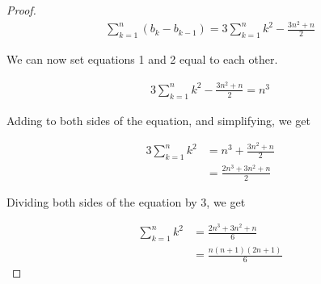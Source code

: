 \documentclass{article}
\begin{document}
\begin{proof}
\begin{align}
\sum_{k=1}^{n} (b_{k} - b_{k-1}) = 3 \sum_{k=1}^{n} k^2 - \frac{3n^2+n}{2}
\end{align}

\begin{flushleft}
We can now set equations 1 and 2 equal to each other.
\end{flushleft}

\begin{align*}
3 \sum_{k=1}^{n} k^2 - \frac{3n^2+n}{2} = n^3
\end{align*}

\begin{flushleft}
Adding to both sides of the equation, and simplifying, we get
\end{flushleft}

\begin{align*}
3 \sum_{k=1}^{n} k^2 &= n^3 + \frac{3n^2+n}{2} \\
&= \frac{2n^3 + 3n^2 + n}{2}
\end{align*}

\begin{flushleft}
Dividing both sides of the equation by 3, we get
\end{flushleft}

\begin{align*}
\sum_{k=1}^{n} k^2 &= \frac{2n^3 + 3n^2 + n}{6} \\
&= \frac{n(n+1)(2n+1)}{6}
\end{align*}

\end{proof}
\end{document}
